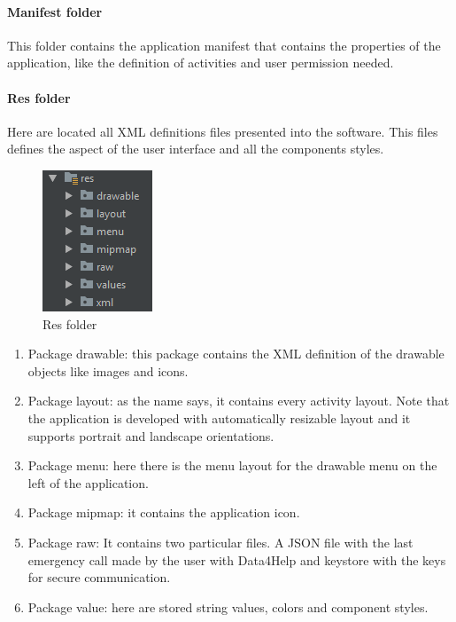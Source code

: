 \paragraph{Manifest folder}
This folder contains the application manifest that contains the properties of the application, like the definition of activities and user permission needed. 

\paragraph{Res folder}
Here are located all XML definitions files presented into the software. 
This files defines the aspect of the user interface and all the components styles.

\begin{figure}[H]
\includegraphics[width=0.6\linewidth]{images/Res.png}
\caption{ Res folder }
\label{fig:pkgsharedata}
\end{figure}

\begin{enumerate}
\item Package drawable: this package contains the XML definition of the drawable objects like images and icons.
\item Package layout: as the name says, it contains every activity layout. 
Note that the application is developed with automatically resizable layout and it supports portrait and landscape orientations.
\item Package menu: here there is the menu layout for the drawable menu on the left of the application.
\item Package mipmap: it contains the application icon.
\item Package raw: It contains two particular files. A JSON file with the last emergency call made by the user with Data4Help and keystore with the keys for secure communication.
\item Package value: here are stored string values, colors and component styles. 
\end{enumerate}

